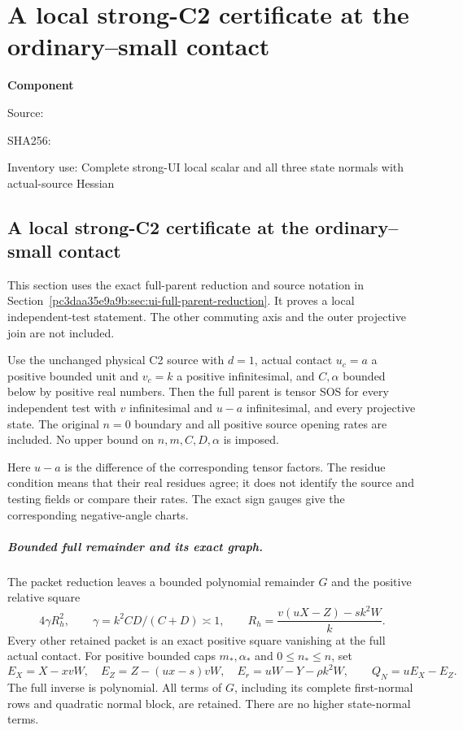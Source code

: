 \chapter{A local strong-C2 certificate at the ordinary--small contact}
\label{component:p76545700d90b}
\noindent\textbf{Component }\par
{\small\noindent Source: \par}
{\small\noindent SHA256: \par}
{\small\noindent Inventory use: Complete strong-UI local scalar and all three state normals with actual-source Hessian\par}
\medskip
\section[A local strong-C2 certificate at the ordinary--small contact]{A local strong-C2 certificate at the ordinary--small contact}
\label{p76545700d90b:sec:local-ui-certificate}

This section uses the exact full-parent reduction and source notation
in Section~\ref{pc3daa35e9a9b:sec:ui-full-parent-reduction}. It proves a local independent-test
statement. The other commuting axis and the outer projective join
are not included.

\begin{theorem}
Use the unchanged physical C2 source with $d=1$, actual contact
$u_c=a$ a positive bounded unit and $v_c=k$ a positive infinitesimal,
and $C,\alpha$ bounded below by positive real numbers. Then the full
parent is tensor SOS for every independent test with $v$ infinitesimal
and $u-a$ infinitesimal, and every projective state. The original
$n=0$ boundary and all positive source opening rates are included.
No upper bound on $n,m,C,D,\alpha$ is imposed.
\end{theorem}

Here $u-a$ is the difference of the corresponding tensor factors.
The residue condition means that their real residues agree; it does
not identify the source and testing fields or compare their rates.
The exact sign gauges give the corresponding negative-angle charts.

\paragraph{Bounded full remainder and its exact graph.}
The packet reduction leaves a bounded polynomial remainder $G$ and
the positive relative square
\[
 4\gamma R_h^2,\qquad
 \gamma=k^2CD/(C+D)\asymp1,\qquad
 R_h=\frac{v(uX-Z)-s k^2W}{k}.
\]
Every other retained packet is an exact positive square vanishing
at the full actual contact. For positive bounded caps $m_*,\alpha_*$
and $0\le n_*\le n$, set
\[
 E_X=X-xvW,\quad E_Z=Z-(ux-s)vW,\quad
 E_r=uW-Y-\rho k^2W,
 \qquad Q_N=uE_X-E_Z.
\]
The full inverse is polynomial. All terms of $G$, including its
complete first-normal rows and quadratic normal block, are retained.
There are no higher state-normal terms.

